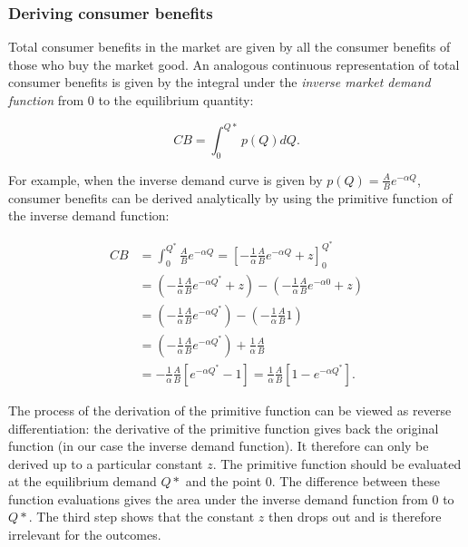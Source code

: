 \documentclass[
]{book}
\begin{document}
\hypertarget{deriving-consumer-benefits}{%
\subsubsection{Deriving consumer benefits}\label{deriving-consumer-benefits}}

Total consumer benefits in the market are given by all the consumer benefits of those who buy the market good. An analogous continuous representation of total consumer benefits is given by the integral under the \emph{inverse market demand function} from 0 to the equilibrium quantity:

\begin{equation}
CB = \int_0^{Q\ast} p(Q) dQ.
\end{equation}

For example, when the inverse demand curve is given by \(p(Q)=\frac{A}{B} e^{-\alpha Q}\), consumer benefits can be derived analytically by using the primitive function of the inverse demand function:

\begin{align}
CB &= \int_0^{Q^\ast}  \frac{A}{B} e^{-\alpha Q} = \left[-\frac{1}{\alpha}\frac{A}{B}e^{-\alpha Q} + z  \right]_0^{Q^\ast} \\
&= \left(-\frac{1}{\alpha}\frac{A}{B}e^{-\alpha Q^\ast} + z \right) - \left(-\frac{1}{\alpha}\frac{A}{B}e^{-\alpha 0} + z \right)\\
&=\left(-\frac{1}{\alpha}\frac{A}{B}e^{-\alpha Q^\ast} \right) - \left(-\frac{1}{\alpha}\frac{A}{B} 1 \right) \\
&=\left(-\frac{1}{\alpha}\frac{A}{B}e^{-\alpha Q^\ast} \right) +\frac{1}{\alpha}\frac{A}{B}  \\
&= - \frac{1}{\alpha}\frac{A}{B}\left[e^{-\alpha Q^\ast} -1 \right] =  \frac{1}{\alpha}\frac{A}{B}\left[ 1 - e^{-\alpha Q^\ast}\right].
\end{align}

The process of the derivation of the primitive function can be viewed as reverse differentiation: the derivative of the primitive function gives back the original function (in our case the inverse demand function). It therefore can only be derived up to a particular constant \(z\). The primitive function should be evaluated at the equilibrium demand \(Q\ast\) and the point \(0\). The difference between these function evaluations gives the area under the inverse demand function from \(0\) to \(Q\ast\). The third step shows that the constant \(z\) then drops out and is therefore irrelevant for the outcomes.
\end{document}
